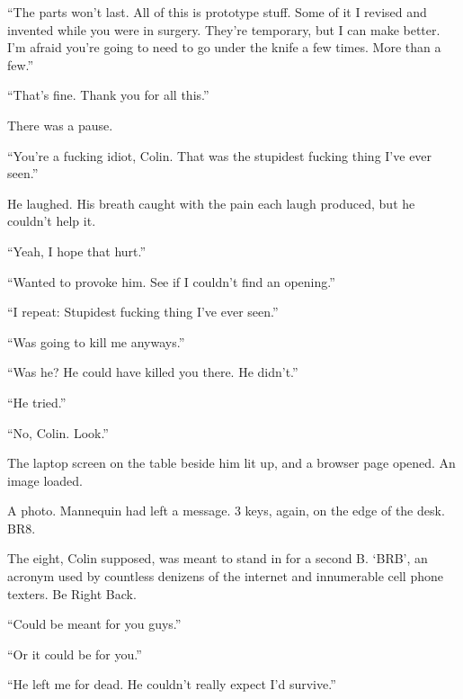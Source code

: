``The parts won't last.  All of this is prototype stuff.  Some of it I revised and invented while you were in surgery.  They're temporary, but I can make better.  I'm afraid you're going to need to go under the knife a few times.  More than a few.''



``That's fine.  Thank you for all this.''



There was a pause.



``You're a fucking idiot, Colin.  That was the stupidest fucking thing I've ever seen.''



He laughed.  His breath caught with the pain each laugh produced, but he couldn't help it.



``Yeah, I hope that hurt.''



``Wanted to provoke him.  See if I couldn't find an opening.''



``I repeat: Stupidest fucking thing I've ever seen.''



``Was going to kill me anyways.''



``Was he?  He could have killed you there.  He didn't.''



``He tried.''



``No, Colin.  Look.''



The laptop screen on the table beside him lit up, and a browser page opened.  An image loaded.



A photo.  Mannequin had left a message.  3 keys, again, on the edge of the desk.  BR8.



The eight, Colin supposed, was meant to stand in for a second B.  `BRB', an acronym used by countless denizens of the internet and innumerable cell phone texters.  Be Right Back.



``Could be meant for you guys.''



``Or it could be for you.''



``He left me for dead. He couldn't really expect I'd survive.''



